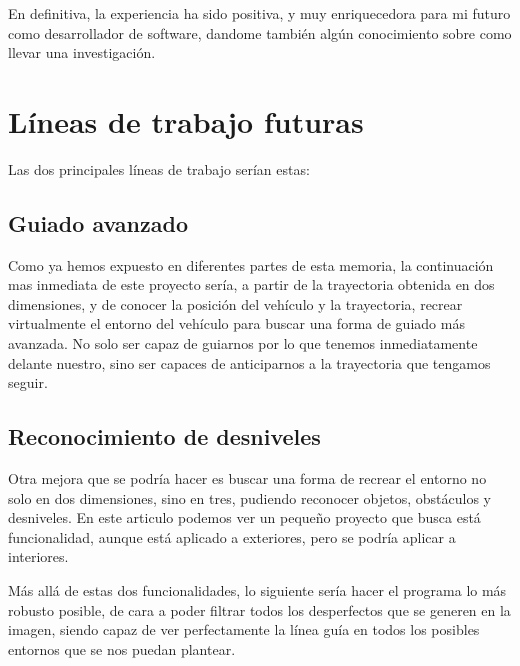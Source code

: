 En definitiva, la experiencia ha sido positiva, y muy enriquecedora para mi futuro como desarrollador de software, dandome también algún conocimiento sobre como llevar una investigación.
 
\section{Líneas de trabajo futuras}

Las dos principales líneas de trabajo serían estas:

\subsection{Guiado avanzado}
Como ya hemos expuesto en diferentes partes de esta memoria, la continuación mas inmediata de este proyecto sería, a partir de la trayectoria obtenida en dos dimensiones, y de conocer la posición del vehículo y la trayectoria, recrear virtualmente el entorno del vehículo para buscar una forma de guiado más avanzada. No solo ser capaz de guiarnos por lo que tenemos inmediatamente delante nuestro, sino ser capaces de anticiparnos a la trayectoria que tengamos seguir.

\subsection{Reconocimiento de desniveles}
Otra mejora que se podría hacer es buscar una forma de recrear el entorno no solo en dos dimensiones, sino en tres, pudiendo reconocer objetos, obstáculos y desniveles. En este articulo\cite{ground_detection} podemos ver un pequeño proyecto que busca está funcionalidad, aunque está aplicado a exteriores, pero se podría aplicar a interiores.


Más allá de estas dos funcionalidades, lo siguiente sería hacer el programa lo más robusto posible, de cara a poder filtrar todos los desperfectos que se generen en la imagen, siendo capaz de ver perfectamente la línea guía en todos los posibles entornos que se nos puedan plantear.
